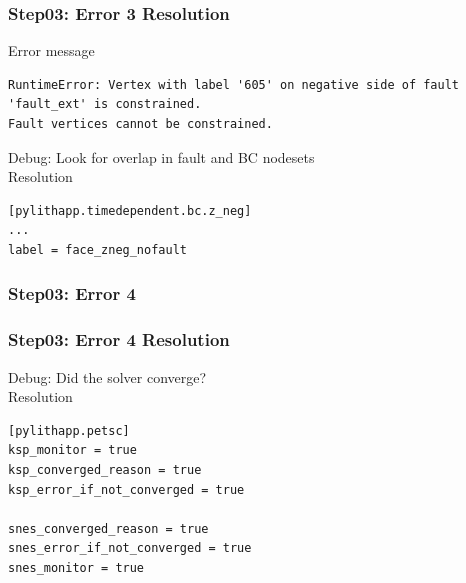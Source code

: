 \documentclass[aspectration=169]{beamer}
\newcommand{\errlabel}[1]{{\small \color{blue}#1}}
\newcommand{\debuginfo}[1]{{\small \color{green}#1}}
\begin{document}
\begin{frame}[fragile]
  \frametitle{Step03: Error 3 Resolution}

\errlabel{Error message}
\begin{lstlisting}
RuntimeError: Vertex with label '605' on negative side of fault 'fault_ext' is constrained.
Fault vertices cannot be constrained.
\end{lstlisting}\pause
\errlabel{Debug:} \debuginfo{Look for overlap in fault and BC nodesets}\pause\\
\errlabel{Resolution}
\begin{lstlisting}
[pylithapp.timedependent.bc.z_neg]
...
label = face_zneg_nofault
\end{lstlisting}

\end{frame}


\begin{frame}[fragile]
  \frametitle{Step03: Error 4}

  \begin{center}
  \end{center}
  
\end{frame}


\begin{frame}[fragile]
  \frametitle{Step03: Error 4 Resolution}

\errlabel{Debug:} \debuginfo{Did the solver converge?}\pause\\
\errlabel{Resolution}
\begin{lstlisting}
[pylithapp.petsc]
ksp_monitor = true
ksp_converged_reason = true
ksp_error_if_not_converged = true

snes_converged_reason = true
snes_error_if_not_converged = true
snes_monitor = true
\end{lstlisting}

\end{frame}
\end{document}
